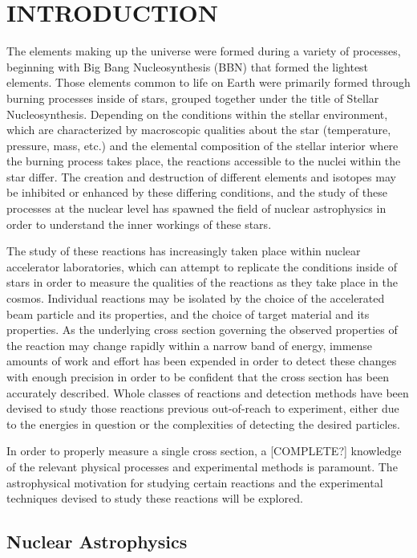 \chapter{INTRODUCTION}

The elements making up the universe were formed during a variety of processes,
beginning with Big Bang Nucleosynthesis (BBN) that formed the lightest
elements. Those elements common to life on Earth were primarily formed through
burning processes inside of stars, grouped together under the title of
Stellar Nucleosynthesis. Depending on the conditions within the stellar
environment, which are characterized by macroscopic qualities about the star
(temperature, pressure, mass, etc.) and the elemental composition of the
stellar interior where the burning process takes place, the reactions
accessible to the nuclei within the star differ. The creation and destruction
of different elements and isotopes may be inhibited or enhanced by these
differing conditions, and the study of these processes at the nuclear level
has spawned the field of nuclear astrophysics in order to understand the inner
workings of these stars.

The study of these reactions has increasingly taken place within nuclear
accelerator laboratories, which can attempt to replicate the conditions inside
of stars in order to measure the qualities of the reactions as they take place
in the cosmos. Individual reactions may be isolated by the choice of the
accelerated beam particle and its properties, and the choice of target material
and its properties. As the underlying cross section governing the observed
properties of the reaction may change rapidly within a narrow band of energy,
immense amounts of work and effort has been expended in order to detect these
changes with enough precision in order to be confident that the cross section
has been accurately described. Whole classes of reactions and detection methods
have been devised to study those reactions previous out-of-reach to experiment,
either due to the energies in question or the complexities of detecting the
desired particles.

In order to properly measure a single cross section, a [COMPLETE?] knowledge of
the relevant physical processes and experimental methods is paramount. The
astrophysical motivation for studying certain reactions and the experimental
techniques devised to study these reactions will be explored.

\section{Nuclear Astrophysics}
\label{sec:ch01-nuclear-astrophysics}

